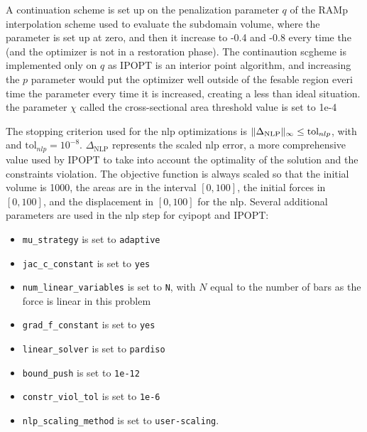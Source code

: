 A continuation scheme is set up on the penalization parameter $q$ of the RAMp interpolation scheme used to evaluate the subdomain volume, where the parameter is set up at zero, and then it increase to -0.4 and -0.8 every time the (and the optimizer is not in a restoration phase). The continaution scgheme is implemented only on $q$ as IPOPT is an interior point algorithm, and increasing the $p$ parameter would put the optimizer well outside of the fesable region everi time the parameter every time it is increased, creating a less than ideal situation. the parameter $\chi$ called the cross-sectional area threshold value is set to 1e-4

The stopping criterion used for the \gls{nlp} optimizations is $\lVert\Delta_{\text{NLP}}\rVert_\infty \leq \text{tol}_{nlp}$, with and $\text{tol}_{nlp}=10^{-8}$. $\Delta_{\text{NLP}}$ represents the scaled \gls{nlp} error, a more comprehensive value used by IPOPT to take into account the optimality of the solution and the constraints violation. The objective function is always scaled so that the initial volume is 1000, the areas are in the interval $[0,100]$, the initial forces in $[0,100]$, and the displacement in $[0,100]$ for the \gls{nlp}. Several additional parameters are used in the \gls{nlp} step for cyipopt and IPOPT:
\begin{itemize}
    \item \texttt{mu\_strategy} is set to \texttt{adaptive} 
    \item \texttt{jac\_c\_constant} is set to \texttt{yes} 
    \item \texttt{num\_linear\_variables} is set to \texttt{N}, with $N$ equal to the number of bars as the force is linear in this problem
    \item \texttt{grad\_f\_constant} is set to \texttt{yes} 
    \item \texttt{linear\_solver} is set to \texttt{pardiso}
    \item \texttt{bound\_push} is set to \texttt{1e-12}
    \item \texttt{constr\_viol\_tol} is set to \texttt{1e-6}
    \item \texttt{nlp\_scaling\_method} is set to \texttt{user-scaling}.
\end{itemize}

